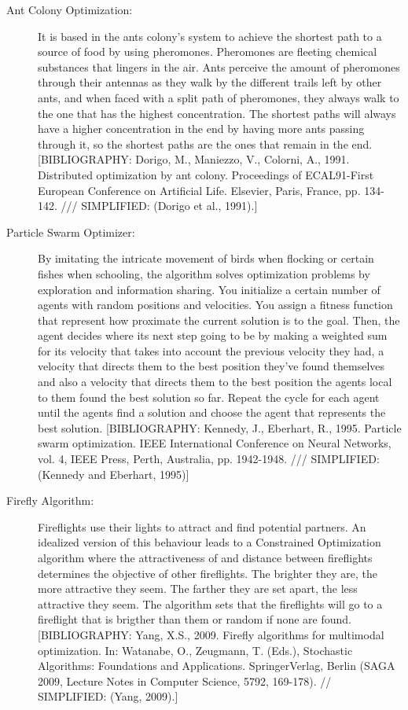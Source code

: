 \begin{description}
\item[Ant Colony Optimization:] It is based in the ants colony's system to achieve the shortest path to a source of food by using pheromones. Pheromones are fleeting chemical substances that lingers in the air. Ants perceive the amount of pheromones through their antennas as they walk by the different trails left by other ants, and when faced with a split path of pheromones, they always walk to the one that has the highest concentration. The shortest paths will always have a higher concentration in the end by having more ants passing through it, so the shortest paths are the ones that remain in the end. [BIBLIOGRAPHY: Dorigo, M., Maniezzo, V., Colorni, A., 1991. Distributed optimization by ant colony. Proceedings of ECAL91-First European Conference on Artificial Life. Elsevier, Paris, France, pp. 134-142. /// SIMPLIFIED: (Dorigo et al., 1991).]

\item[Particle Swarm Optimizer:] By imitating the intricate movement of birds when flocking or certain fishes when schooling, the algorithm solves optimization problems by exploration and information sharing. You initialize a certain number of agents with random positions and velocities. You assign a fitness function that represent how proximate the current solution is to the goal. Then, the agent decides where its next step going to be by making a weighted sum for its velocity that takes into account the previous velocity they had, a velocity that directs them to the best position they've found themselves and also a velocity that directs them to the best position the agents local to them found the best solution so far. Repeat the cycle for each agent until the agents find a solution and choose the agent that represents the best solution. [BIBLIOGRAPHY: Kennedy, J., Eberhart, R., 1995. Particle swarm optimization. IEEE International Conference on Neural Networks, vol. 4, IEEE Press, Perth, Australia, pp. 1942-1948. /// SIMPLIFIED:  (Kennedy and Eberhart, 1995)]

\item[Firefly Algorithm:] Fireflights use their lights to attract and find potential partners. An idealized version of this behaviour leads to a Constrained Optimization algorithm where the attractiveness of and distance between fireflights determines the objective of other fireflights. The brighter they are, the more attractive they seem. The farther they are set apart, the less attractive they seem. The algorithm sets that the fireflights will go to a fireflight that is brigther than them or random if none are found. [BIBLIOGRAPHY: Yang, X.S., 2009. Firefly algorithms for multimodal optimization. In: Watanabe, O., Zeugmann, T. (Eds.), Stochastic Algorithms: Foundations and Applications. SpringerVerlag, Berlin (SAGA 2009, Lecture Notes in Computer Science, 5792, 169-178). // SIMPLIFIED: (Yang, 2009).]


\end{description}
